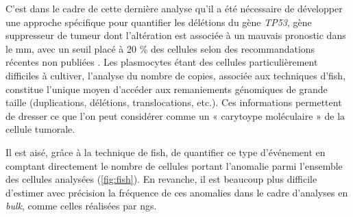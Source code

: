 \vspace{1em}

C'est dans le cadre de cette dernière analyse qu'il a été nécessaire de développer une approche spécifique pour quantifier les délétions du gène \textit{TP53}, 
gène suppresseur de tumeur dont l'altération est associée à un mauvais pronostic dans le \gls{mm}, avec un seuil placé à 20 \% des cellules selon des recommandations 
récentes non publiées \cite{flyntPrognosisBiologyTargeting2020}.
Les plasmocytes étant des cellules particulièrement difficiles à cultiver, l'analyse du nombre de copies, associée aux techniques d'\gls{fish}, constitue l'unique 
moyen d'accéder aux remaniements génomiques de grande taille (duplications, délétions, translocations, etc.).
Ces informations permettent de dresser ce que l'on peut considérer comme un « carytoype moléculaire » de la cellule tumorale. 

\vspace{1em}

Il est aisé, grâce à la technique de \gls{fish}, de quantifier ce type d'événement en comptant directement le nombre de cellules portant l'anomalie parmi l'ensemble des cellules analysées 
(\autoref{fig:fish}).  
En revanche, il est beaucoup plus difficile d'estimer avec précision la fréquence de ces anomalies dans le cadre d'analyses en \textit{bulk}, comme celles réalisées par \gls{ngs}.

